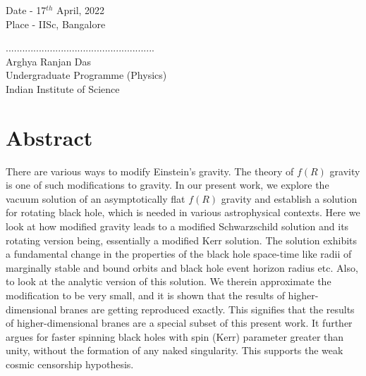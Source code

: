 \documentclass[12pt,a4paper,oneside]{book}
\begin{document}
\begin{flushleft}
Date - 17$^{th}$ April, 2022 \\
Place - IISc, Bangalore           
\end{flushleft}
$......................................................$ \\
Arghya Ranjan Das\\
Undergraduate Programme (Physics)\\
Indian Institute of Science\\[2em]
\newpage




\chapter*{\centering Abstract}
    \hspace{15pt}\noindent There are various ways to modify Einstein's gravity. The theory of $f(R)$ gravity is one of such modifications to gravity. In our present work, we  explore the vacuum solution of an asymptotically flat $f(R)$ gravity and establish a solution for rotating black hole, which is needed in various astrophysical contexts. Here we look at how modified gravity leads to a modified Schwarzschild solution and its rotating version being, essentially a modified Kerr solution. The solution exhibits a fundamental change in the properties of the black hole space-time like radii of marginally stable and bound orbits and black hole event horizon radius etc. Also, to look at the analytic version of this solution. We therein approximate the modification to be very small, and it is shown that the results of higher-dimensional branes are getting reproduced exactly. This signifies that the results of higher-dimensional branes are a special subset of this present work. It further argues for faster spinning black holes with spin (Kerr) parameter greater than unity, without the formation of any naked singularity. This supports the weak cosmic censorship hypothesis. 
\end{document}
